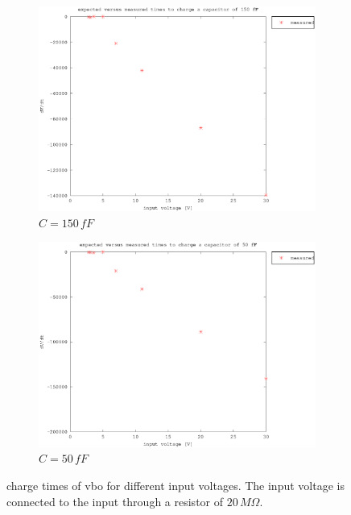 \documentclass{article}
\begin{document}
\begin{figure}[h]
\begin{subfigure}[b]{0.475\textwidth}
	    \centering 
	    \includegraphics[width=\textwidth]{fig/vbo_vin_vs_time_sat_150fF.eps}
	    \caption[]%
	    {$C=150\,fF$}    
	    \label{fig:vbo_e_vs_m_150fF}
	\end{subfigure}
	\quad
	\begin{subfigure}[b]{0.475\textwidth}   
	    \centering 
	    \includegraphics[width=\textwidth]{fig/vbo_vin_vs_time_sat_50fF.eps}
	    \caption[]%
	    {$C=50\,fF$}    
	    \label{fig:vbo_e_vs_m_50fF}
	\end{subfigure}
	\caption{charge times of vbo for different input voltages. The input voltage is connected to the input through a resistor of $20\,M\Omega$.}
	\label{fig:vbo_e_vs_m}
\end{figure}




\clearpage

\
\end{document}

